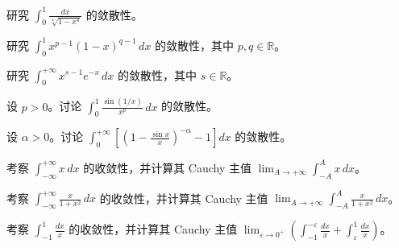 \noindent\begin{minipage}{\textwidth}
研究 $\displaystyle\int_0^1\frac{dx}{\sqrt[4]{1-x^4}}$ 的敛散性。
\end{minipage}\par\vfill
\noindent\begin{minipage}{\textwidth}
研究 $\displaystyle\int_0^1x^{p-1}(1-x)^{q-1}\,dx$ 的敛散性，其中 $p,q\in\mathbb R$。
\end{minipage}\par\vfill
\newpage
\noindent\begin{minipage}{\textwidth}
研究 $\displaystyle\int_0^{+\infty}x^{s-1}e^{-x}\,dx$ 的敛散性，其中 $s\in\mathbb R$。
\end{minipage}\par\vfill
\noindent\begin{minipage}{\textwidth}
设 $p>0$。讨论 $\displaystyle\int_0^1\frac{\sin(1/x)}{x^p}\,dx$ 的敛散性。
\end{minipage}\par\vfill
\noindent\begin{minipage}{\textwidth}
设 $\alpha>0$。讨论 $\displaystyle\int_0^{+\infty}\left[\left(1-\frac{\sin x}{x}\right)^{-\alpha}-1\right]dx$ 的敛散性。
\end{minipage}\par\vfill
\newpage
\noindent\begin{minipage}{\textwidth}
考察 $\int_{-\infty}^{+\infty}x\,dx$ 的收敛性，并计算其 Cauchy 主值 $\displaystyle\lim_{A\to+\infty}\int_{-A}^Ax\,dx$。
\end{minipage}\par\vfill
\noindent\begin{minipage}{\textwidth}
考察 $\displaystyle\int_{-\infty}^{+\infty}\frac{x}{1+x^2}\,dx$ 的收敛性，并计算其 Cauchy 主值 $\displaystyle\lim_{A\to+\infty}\int_{-A}^A\frac{x}{1+x^2}\,dx$。
\end{minipage}\par\vfill
\noindent\begin{minipage}{\textwidth}
考察 $\displaystyle\int_{-1}^1\frac{dx}{x}$ 的收敛性，并计算其 Cauchy 主值 $\displaystyle\lim_{\varepsilon\to0^+}\left(\int_{-1}^{-\varepsilon}\frac{dx}{x}+\int_\varepsilon^1\frac{dx}{x}\right)$。
\end{minipage}\par\vfill
